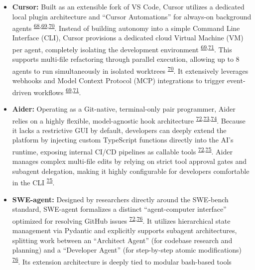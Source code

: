 \documentclass[
  11pt,
]{article}
\providecommand{\tightlist}{%
  \setlength{\itemsep}{0pt}\setlength{\parskip}{0pt}}
\begin{document}
\begin{itemize}
\tightlist
\item
  \textbf{Cursor:} Built as an extensible fork of VS Code, Cursor
  utilizes a dedicated local plugin architecture and ``Cursor
  Automations'' for always-on background agents
  \textsuperscript{\protect\hyperlink{cite-68}{68},\protect\hyperlink{cite-69}{69},\protect\hyperlink{cite-70}{70}}.
  Instead of building autonomy into a simple Command Line Interface
  (CLI), Cursor provisions a dedicated cloud Virtual Machine (VM) per
  agent, completely isolating the development environment
  \textsuperscript{\protect\hyperlink{cite-69}{69},\protect\hyperlink{cite-71}{71}}.
  This supports multi-file refactoring through parallel execution,
  allowing up to 8 agents to run simultaneously in isolated worktrees
  \textsuperscript{\protect\hyperlink{cite-70}{70}}. It extensively
  leverages webhooks and Model Context Protocol (MCP) integrations to
  trigger event-driven workflows
  \textsuperscript{\protect\hyperlink{cite-69}{69},\protect\hyperlink{cite-71}{71}}.
\item
  \textbf{Aider:} Operating as a Git-native, terminal-only pair
  programmer, Aider relies on a highly flexible, model-agnostic hook
  architecture
  \textsuperscript{\protect\hyperlink{cite-72}{72},\protect\hyperlink{cite-73}{73},\protect\hyperlink{cite-74}{74}}.
  Because it lacks a restrictive GUI by default, developers can deeply
  extend the platform by injecting custom TypeScript functions directly
  into the AI's runtime, exposing internal CI/CD pipelines as callable
  tools
  \textsuperscript{\protect\hyperlink{cite-72}{72},\protect\hyperlink{cite-75}{75}}.
  Aider manages complex multi-file edits by relying on strict tool
  approval gates and subagent delegation, making it highly configurable
  for developers comfortable in the CLI
  \textsuperscript{\protect\hyperlink{cite-75}{75}}.
\item
  \textbf{SWE-agent:} Designed by researchers directly around the
  SWE-bench standard, SWE-agent formalizes a distinct ``agent-computer
  interface'' optimized for resolving GitHub issues
  \textsuperscript{\protect\hyperlink{cite-72}{72},\protect\hyperlink{cite-76}{76}}.
  It utilizes hierarchical state management via Pydantic and explicitly
  supports subagent architectures, splitting work between an ``Architect
  Agent'' (for codebase research and planning) and a ``Developer Agent''
  (for step-by-step atomic modifications)
  \textsuperscript{\protect\hyperlink{cite-76}{76}}. Its extension
  architecture is deeply tied to modular bash-based tools

\end{itemize}
\end{document}
